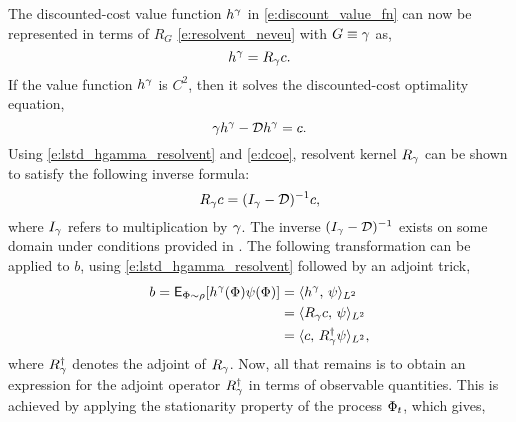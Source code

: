 The discounted-cost value function $h^\gamma$ in \eqref{e:discount_value_fn} can now be represented in terms of $R_G$ \eqref{e:resolvent_neveu} with $G \equiv \gamma$ as,
\begin{equation}
h^\discount = R_\discount c.
\label{e:lstd_hgamma_resolvent}
\end{equation}
If the value function $h^\gamma$ is $C^2$, then it solves the discounted-cost optimality equation,
\begin{equation}
\discount h^\discount - \generate h^\discount =  c.
\label{e:dcoe}
\end{equation}
Using \eqref{e:lstd_hgamma_resolvent} and \eqref{e:dcoe}, resolvent kernel $R_\gamma$ can be shown to satisfy the following inverse formula:
\begin{equation}
R_\gamma c = ( I_\gamma - {\cal D})^{-1} c,
\end{equation}
where $I_\gamma$ refers to multiplication by $\gamma$. The inverse $(I_\gamma - {\cal D})^{-1}$ exists on some domain under conditions provided in \cite{devkonmey17a}.  
The following transformation can be applied to $b$, using \eqref{e:lstd_hgamma_resolvent} followed by an adjoint trick,
\begin{equation}
\begin{aligned}
b = {\sf E}_{\Phi \sim \rho} [h^\gamma(\Phi) \psi(\Phi) ] &= \langle h^\gamma, \, \psi \rangle_{L^2}\\
& = \langle R_\gamma c, \,\psi \rangle_{L^2} \\
& = \langle c,\, R^\dagger_\gamma \psi \rangle_{L^2},
\end{aligned}
\end{equation}
where $R^\dagger_\gamma$ denotes the adjoint of $R_\gamma$. Now, all that remains is to obtain an expression for the adjoint operator $R^\dagger_\gamma$ in terms of observable quantities. This is achieved by applying the stationarity property of the process $\Phi_t$, which gives, 
